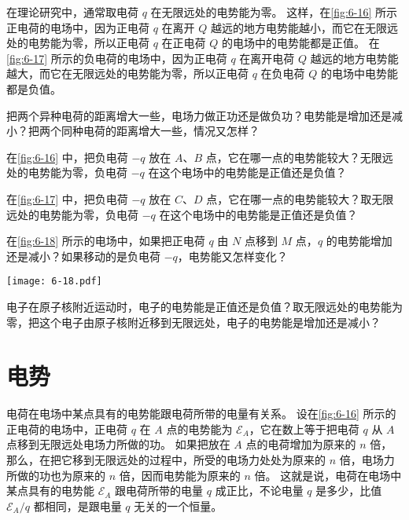 在理论研究中，通常取电荷 $q$ 在无限远处的电势能为零。
这样，在\cref{fig:6-16} 所示正电荷的电场中，因为正电荷 $q$ 在离开 $Q$ 越远的地方电势能越小，而它在无限远处的电势能为零，所以正电荷 $q$ 在正电荷 $Q$ 的电场中的电势能都是正值。
在\cref{fig:6-17} 所示的负电荷的电场中，因为正电荷 $q$ 在离开电荷 $Q$ 越远的地方电势能越大，而它在无限远处的电势能为零，所以正电荷 $q$ 在负电荷 $Q$ 的电场中电势能都是负值。

\begin{Practice}
\begin{question}
	\item 把两个异种电荷的距离增大一些，电场力做正功还是做负功？电势能是增加还是减小？把两个同种电荷的距离增大一些，情况又怎样？
	\item 在\cref{fig:6-16} 中，把负电荷 $-q$ 放在 $A$、$B$ 点，它在哪一点的电势能较大？无限远处的电势能为零，负电荷 $-q$ 在这个电场中的电势能是正值还是负值？
	\item 在\cref{fig:6-17} 中，把负电荷 $-q$ 放在 $C$、$D$ 点，它在哪一点的电势能较大？取无限远处的电势能为零，负电荷 $-q$ 在这个电场中的电势能是正值还是负值？
	\item 在\cref{fig:6-18} 所示的电场中，如果把正电荷 $q$ 由 $N$ 点移到 $M$ 点，$q$ 的电势能增加还是减小？如果移动的是负电荷 $-q$，电势能又怎样变化？
	\begin{figurehere}
    \begin{minipage}{\linewidth}\centering
			\texttt{[image: 6-18.pdf]}
			\caption{}\label{fig:6-18}
		\end{minipage}
	\end{figurehere}	
	\item  电子在原子核附近运动时，电子的电势能是正值还是负值？取无限远处的电势能为零，把这个电子由原子核附近移到无限远处，电子的电势能是增加还是减小？
\end{question}
\end{Practice}


\section{电势}
电荷在电场中某点具有的电势能跟电荷所带的电量有关系。
设在\cref{fig:6-16} 所示的正电荷的电场中，正电荷 $q$ 在 $A$ 点的电势能为 $\mathcal{E}_A$，它在数上等于把电荷 $q$ 从 $A$ 点移到无限远处电场力所做的功。
如果把放在 $A$ 点的电荷增加为原来的 $n$ 倍，那么，在把它移到无限远处的过程中，所受的电场力处处为原来的 $n$ 倍，电场力所做的功也为原来的 $n$ 倍，因而电势能为原来的 $n$ 倍。
这就是说，电荷在电场中某点具有的电势能 $\mathcal{E}_A$ 跟电荷所带的电量 $q$ 成正比，不论电量 $q$ 是多少，比值 $\mathcal{E}_A/q$ 都相同，是跟电量 $q$ 无关的一个恒量。

